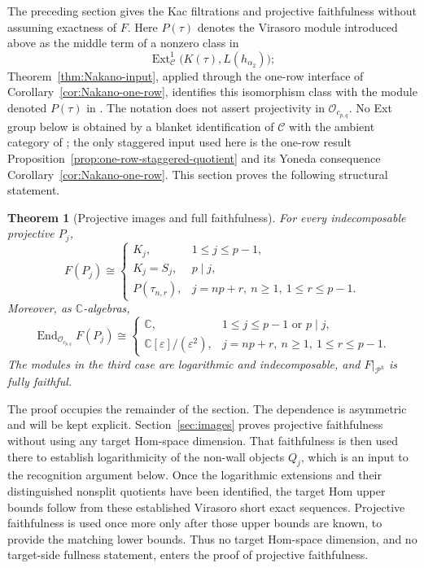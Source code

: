 \documentclass[12pt,leqno]{amsart}
\numberwithin{equation}{section}
\newtheorem{thm}{Theorem}[section]
\newcommand{\End}{\operatorname{End}}
\newcommand{\Ext}{\operatorname{Ext}}
\newcommand{\Oc}{\mathcal O}
\def\C{\mathbb{C}}
\begin{document}
The preceding section gives the Kac filtrations and projective faithfulness
without assuming exactness of $F$.  Here $P(\tau)$ denotes the Virasoro module introduced above as the middle
term of a nonzero class in
\[
 \Ext^1_{\mathscr C}\bigl(K(\tau),L(h_{\alpha_2})\bigr);
\]
Theorem~\ref{thm:Nakano-input}, applied through the one-row interface
of Corollary~\ref{cor:Nakano-one-row}, identifies this isomorphism class
with the module denoted $P(\tau)$ in
\cite[Definition~5.13]{Nakano}.  The notation does not assert
projectivity in $\Oc_{c_{p,q}}$.  No Ext group below is obtained by a
blanket identification of $\mathscr C$ with the ambient category of
\cite[Definition~3.14]{Nakano}; the only staggered input used here is the
one-row result Proposition~\ref{prop:one-row-staggered-quotient} and its
Yoneda consequence Corollary~\ref{cor:Nakano-one-row}.  This section proves the
following structural statement.

\begin{thm}[Projective images and full faithfulness]\label{thm:projective-classification}
For every indecomposable projective $P_j$,
\[
 F(P_j)\cong
 \begin{cases}
  K_j,&1\le j\le p-1,\\
  K_j=S_j,&p\mid j,\\
  P(\tau_{n,r}),&j=np+r,\ n\ge1,\ 1\le r\le p-1.
 \end{cases}
\]
Moreover, as $\C$-algebras,
\[
 \End_{\Oc_{c_{p,q}}} F(P_j)\cong
 \begin{cases}
  \C,&1\le j\le p-1\text{ or }p\mid j,\\
  \C[\varepsilon]/(\varepsilon^2),
      &j=np+r,\ n\ge1,\ 1\le r\le p-1.
 \end{cases}
\]
The modules in the third case are logarithmic and indecomposable, and
$F|_{\mathcal P^k}$ is fully faithful.
\end{thm}

The proof occupies the remainder of the section.  The dependence is
asymmetric and will be kept explicit.  Section~\ref{sec:images} proves
projective faithfulness without using any target Hom-space dimension.  That
faithfulness is then used there to establish logarithmicity of the non-wall
objects $Q_j$, which is an input to the recognition argument below.  Once
the logarithmic extensions and their distinguished nonsplit quotients have
been identified, the target Hom upper bounds follow from these established
Virasoro short exact sequences.  Projective faithfulness is used once more
only after those upper bounds are known, to provide the matching lower
bounds.  Thus no target Hom-space dimension, and no target-side fullness
statement, enters the proof of projective faithfulness.
\end{document}
